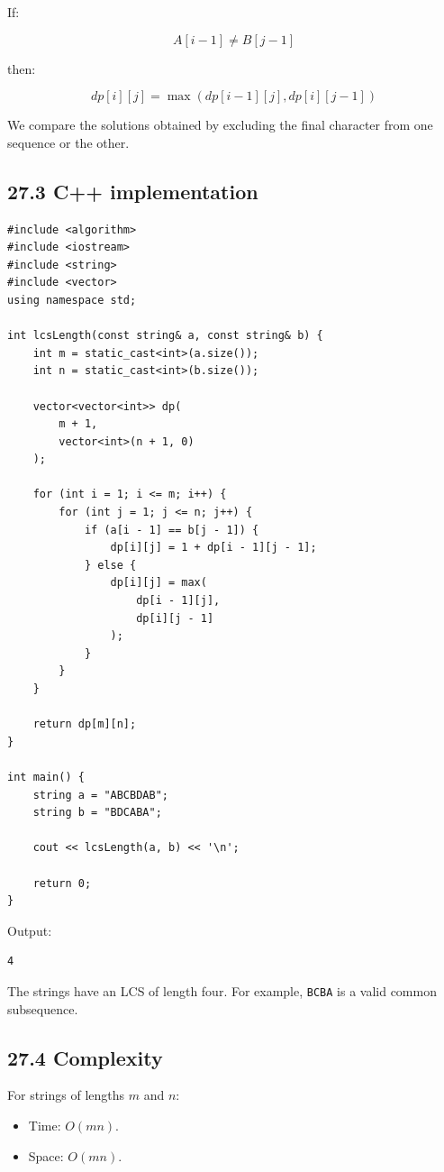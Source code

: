 If:


\[
A[i-1]\neq B[j-1]
\]


then:


\[
\boxed{dp[i][j]=\max(dp[i-1][j],dp[i][j-1])}
\]


We compare the solutions obtained by excluding the final character from one sequence or the other.

\subsection{27.3 C++ implementation}

\begin{lstlisting}[style=cppstyle]
#include <algorithm>
#include <iostream>
#include <string>
#include <vector>
using namespace std;

int lcsLength(const string& a, const string& b) {
    int m = static_cast<int>(a.size());
    int n = static_cast<int>(b.size());

    vector<vector<int>> dp(
        m + 1,
        vector<int>(n + 1, 0)
    );

    for (int i = 1; i <= m; i++) {
        for (int j = 1; j <= n; j++) {
            if (a[i - 1] == b[j - 1]) {
                dp[i][j] = 1 + dp[i - 1][j - 1];
            } else {
                dp[i][j] = max(
                    dp[i - 1][j],
                    dp[i][j - 1]
                );
            }
        }
    }

    return dp[m][n];
}

int main() {
    string a = "ABCBDAB";
    string b = "BDCABA";

    cout << lcsLength(a, b) << '\n';

    return 0;
}
\end{lstlisting}

Output:

\begin{lstlisting}[style=pseudocode]
4
\end{lstlisting}

The strings have an LCS of length four. For example, \texttt{BCBA} is a valid common subsequence.

\subsection{27.4 Complexity}

For strings of lengths $m$ and $n$:

\begin{itemize}
    \item Time: $O(mn)$.
    \item Space: $O(mn)$.
\end{itemize}

